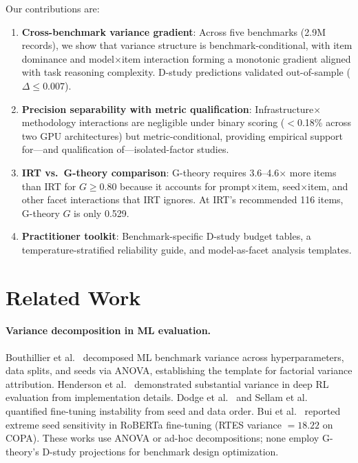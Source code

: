 \documentclass[11pt,a4paper]{article}
\newcommand{\Gcoeff}{\ensuremath{G}}
\begin{document}
Our contributions are:
\begin{enumerate}[leftmargin=*,nosep]
\item \textbf{Cross-benchmark variance gradient}: Across five benchmarks (2.9M records), we show that variance structure is benchmark-conditional, with item dominance and model$\times$item interaction forming a monotonic gradient aligned with task reasoning complexity.
    D-study predictions validated out-of-sample ($\Delta\leq0.007$).
\item \textbf{Precision separability with metric qualification}: Infrastructure$\times$methodology interactions are negligible under binary scoring ($<$0.18\% across two GPU architectures) but metric-conditional, providing empirical support for---and qualification of---isolated-factor studies.
\item \textbf{IRT vs.\ G-theory comparison}: G-theory requires 3.6--4.6$\times$ more items than IRT for $\Gcoeff\geq0.80$ because it accounts for prompt$\times$item, seed$\times$item, and other facet interactions that IRT ignores. At IRT's recommended 116 items, G-theory $\Gcoeff$ is only 0.529.
\item \textbf{Practitioner toolkit}: Benchmark-specific D-study budget tables, a temperature-stratified reliability guide, and model-as-facet analysis templates.
\end{enumerate}

\section{Related Work}

\paragraph{Variance decomposition in ML evaluation.}
Bouthillier et al.~\citeyearpar{bouthillier2021} decomposed ML benchmark variance across hyperparameters, data splits, and seeds via ANOVA, establishing the template for factorial variance attribution.
Henderson et al.~\citeyearpar{henderson2018} demonstrated substantial variance in deep RL evaluation from implementation details.
Dodge et al.~\citeyearpar{dodge2020} and Sellam et al.~\citeyearpar{sellam2022} quantified fine-tuning instability from seed and data order.
Bui et al.~\citeyearpar{bui2025} reported extreme seed sensitivity in RoBERTa fine-tuning (RTES variance $=18.22$ on COPA).
These works use ANOVA or ad-hoc decompositions; none employ G-theory's D-study projections for benchmark design optimization.
\end{document}
